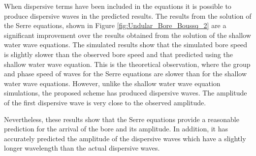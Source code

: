 \documentclass[SingleSpace,12pt]{Serre_ASCE}
\begin{document}
When dispersive terms have been included in the equations it is possible to produce dispersive waves in the predicted results. The results from the solution of the Serre equations, shown in Figure \ref{fig:Undular_Bore_Boussq_2} are a significant improvement over the results obtained from the solution of the shallow water wave equations. The simulated results show that the simulated bore speed is slightly slower than the observed bore speed and that predicted using the shallow water wave equation. This is the theoretical observation, where the group and phase speed of waves for the Serre equations are slower than for the shallow water wave equations. However, unlike the shallow water wave equation simulations, the proposed scheme has produced dispersive waves. The amplitude of the first dispersive wave is very close to the observed amplitude.

Nevertheless, these results show that the Serre equations provide a reasonable prediction for the arrival of the bore and its amplitude. In addition, it has accurately predicted the amplitude of the dispersive waves which have a slightly longer wavelength than the actual dispersive waves.
\end{document}
